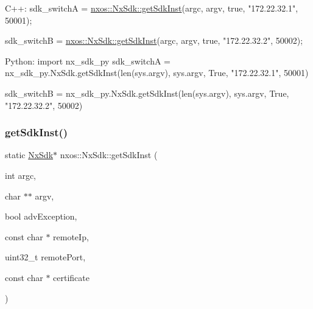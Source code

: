 \begin{DoxyCode}
C++:                                                                                  
     sdk\_switchA  = \mbox{\hyperlink{classnxos_1_1_nx_sdk_a5050e2d26c40744b4fc7862068a83f39}{nxos::NxSdk::getSdkInst}}(argc, argv, \textcolor{keyword}{true}, \textcolor{stringliteral}{"172.22.32.1"}, 50001);
                                       
     sdk\_switchB  = \mbox{\hyperlink{classnxos_1_1_nx_sdk_a5050e2d26c40744b4fc7862068a83f39}{nxos::NxSdk::getSdkInst}}(argc, argv, \textcolor{keyword}{true}, \textcolor{stringliteral}{"172.22.32.2"}, 50002);
       
                                                                                      
Python:                                                                               
     \textcolor{keyword}{import} nx\_sdk\_py                                                                 
     sdk\_switchA = nx\_sdk\_py.NxSdk.getSdkInst(len(sys.argv), sys.argv, True, \textcolor{stringliteral}{"172.22.32.1"}, 50001)         
               
     sdk\_switchB = nx\_sdk\_py.NxSdk.getSdkInst(len(sys.argv), sys.argv, True, \textcolor{stringliteral}{"172.22.32.2"}, 50002)   
\end{DoxyCode}
 \mbox{\label{classnxos_1_1_nx_sdk_a225be30e47270295fbe08151b4745692}} 
\subsubsection{\texorpdfstring{get\+Sdk\+Inst()}{getSdkInst()}\hspace{0.1cm}{\footnotesize\ttfamily [4/4]}}
{\footnotesize\ttfamily static \mbox{\hyperlink{classnxos_1_1_nx_sdk}{Nx\+Sdk}}$\ast$ nxos\+::\+Nx\+Sdk\+::get\+Sdk\+Inst (\begin{DoxyParamCaption}\item[{int}]{argc,  }\item[{char $\ast$$\ast$}]{argv,  }\item[{bool}]{adv\+Exception,  }\item[{const char $\ast$}]{remote\+Ip,  }\item[{uint32\+\_\+t}]{remote\+Port,  }\item[{const char $\ast$}]{certificate }\end{DoxyParamCaption})\hspace{0.3cm}{\ttfamily [static]}}

